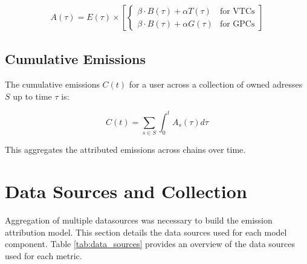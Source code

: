 \documentclass[11pt]{report}
\begin{document}
\begin{align}
    A(\tau) = E(\tau) \times \left[\begin{cases}
                                           \beta \cdot B(\tau) + \alpha T(\tau)  & \text{for VTCs} \\
                                           \beta \cdot B(\tau) +  \alpha G(\tau) & \text{for GPCs}
                                       \end{cases}\right]
\end{align}

\subsection*{Cumulative Emissions}

The cumulative emissions $C(t)$ for a user across a collection of owned adresses $S$ up to time $\tau$ is:

\begin{equation}
    C(t) = \sum_{s \in S} \int_{0}^{t} A_s(\tau) d\tau
\end{equation}

This aggregates the attributed emissions across chains over time.

\section{Data Sources and Collection \label{sec:data_sources}}

Aggregation of multiple datasources was necessary to build the emission attribution model. This section details the data sources used for each model component. Table \ref{tab:data_sources} provides an overview of the data sources used for each metric.
\end{document}
